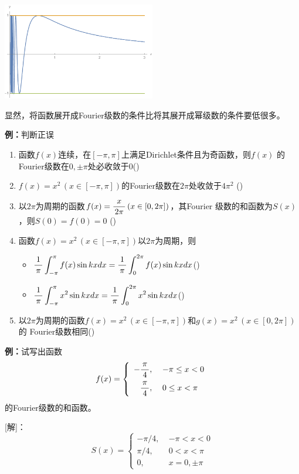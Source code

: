 \begin{center}
	\includegraphics[width=0.5\textwidth]{./images/ch12/sin1x.pdf}
\end{center}

显然，将函数展开成Fourier级数的条件比将其展开成幂级数的条件要低很多。

{\bf 例：}判断正误
\begin{enumerate}[(1)]
  \setlength{\itemindent}{1cm}
  \item 函数$f(x)$连续，在$[-\pi,\pi]$上满足Dirichlet条件且为奇函数，则$f(x)$
  的Fourier级数在$0,\pm\pi$处必收敛于$0$\quad  (\;{$\surd$}\;) 
  \item $f(x)=x^2\,(x\in[-\pi,\pi])$的Fourier级数在$2\pi$处收敛于$4\pi^2$
    \quad(\;{$\times$}\;) 
  \item 以$2\pi$为周期的函数$f(x)=\displaystyle\frac{\,{x}\,}{\,{2\pi}\,}\,(x\in[0,2\pi])$，其Fourier
  级数的和函数为$S(x)$，则$S(0)=f(0)=0$ 
  \quad (\;{$\times$}\;)
  \item 函数$f(x)=x^2\,(x\in[-\pi,\pi])$以$2\pi$为周期，则 
  \begin{itemize}
    \item $\displaystyle\frac{\,{1}\,}{\,{\pi}\,}\displaystyle\int_{-\pi}^{\pi}f(x)\sin kxdx=\displaystyle\frac{\,{1}\,}{\,{\pi}\,}\displaystyle\int_{0}^{2\pi}f(x)\sin kxdx$\quad (\;{$\surd$}\;) 
    \item $\displaystyle\frac{\,{1}\,}{\,{\pi}\,}\displaystyle\int_{-\pi}^{\pi}x^2\sin kxdx=\displaystyle\frac{\,{1}\,}{\,{\pi}\,}\displaystyle\int_{0}^{2\pi}x^2\sin kxdx$\quad (\;{$\times$}\;) 
  \end{itemize}
  \item 以$2\pi$为周期的函数$f(x)=x^2\,(x\in[-\pi,\pi])$和$g(x)=x^2\,(x\in[0,2\pi])$的
  Fourier级数相同\quad (\;{$\times$}\;)
\end{enumerate}

{\bf 例：}试写出函数
$$f(x)=\left\{\begin{array}{rl}
	-\displaystyle\frac{\,{\pi}\,}{\,{4}\,},\; & -\pi\leq x<0\\[8pt]
	\displaystyle\frac{\,{\pi}\,}{\,{4}\,},\; & 0\leq x<\pi
\end{array}\right.$$
的Fourier级数的和函数。

[解]：
$${S(x)=\left\{\begin{array}{ll}
	-\pi/4,\;& -\pi<x<0\\
	\pi/4,\;& 0<x<\pi\\
	0,\; & x=0,\pm\pi
\end{array}\right.}$$
\fin

